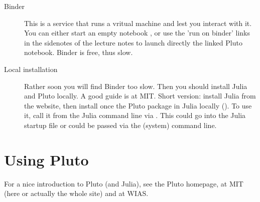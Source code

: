 \begin{description}


\item[Binder] This is a service that runs a vritual machine and lest you interact with it. You can either start an empty notebook , or use the 'run on binder' links in the sidenotes of the lecture notes to launch directly the linked Pluto notebook. Binder is free, thus slow.

\item[Local installation] Rather soon you will find Binder too slow. Then you should install Julia and Pluto locally. A good guide is at MIT. Short version: install Julia from the website, then install once the Pluto package in Julia locally (). To use it, call it from the Julia command line  via . This could go into the Julia startup file or could be passed via the (system) command line.



\end{description}


\section{Using Pluto}

For a nice introduction to Pluto (and Julia), see the Pluto homepage,
 at MIT 
(here
or actually the whole site)
and at WIAS.

